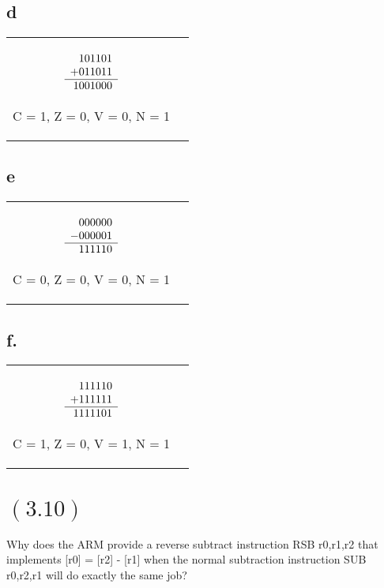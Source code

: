 \documentclass[letterpaper,12pt,titlepage]{article}
\begin{document}
\subsection*{d}
\begin{mdframed}[style=MyFrame]
\begin{tabular}{c c}
$\begin{array}[t]{r}
   101101 \\
  +011011 \\\hline
  1001000 \\
\end{array}$

C = 1,
Z = 0,
V = 0,
N = 1
\end{tabular}
\end{mdframed}
\newpage
\subsection*{e}
\begin{mdframed}[style=MyFrame]
\begin{tabular}{c c}
$\begin{array}[t]{r}
   000000 \\
  -000001 \\\hline
   111110 \\
\end{array}$

C = 0,
Z = 0,
V = 0,
N = 1
\end{tabular}
\end{mdframed}

\subsection*{f.}
\begin{mdframed}[style=MyFrame]
\begin{tabular}{c c}
$\begin{array}[t]{r}
   111110 \\
  +111111 \\\hline
  1111101 \\
\end{array}$

C = 1,
Z = 0,
V = 1,
N = 1
\end{tabular}
\end{mdframed}

\section*{$(3.10)$} Why does the ARM provide a reverse subtract instruction RSB r0,r1,r2 that implements [r0] = [r2] - [r1] when the normal subtraction instruction SUB r0,r2,r1 will do exactly the same job? \newline
\end{document}

